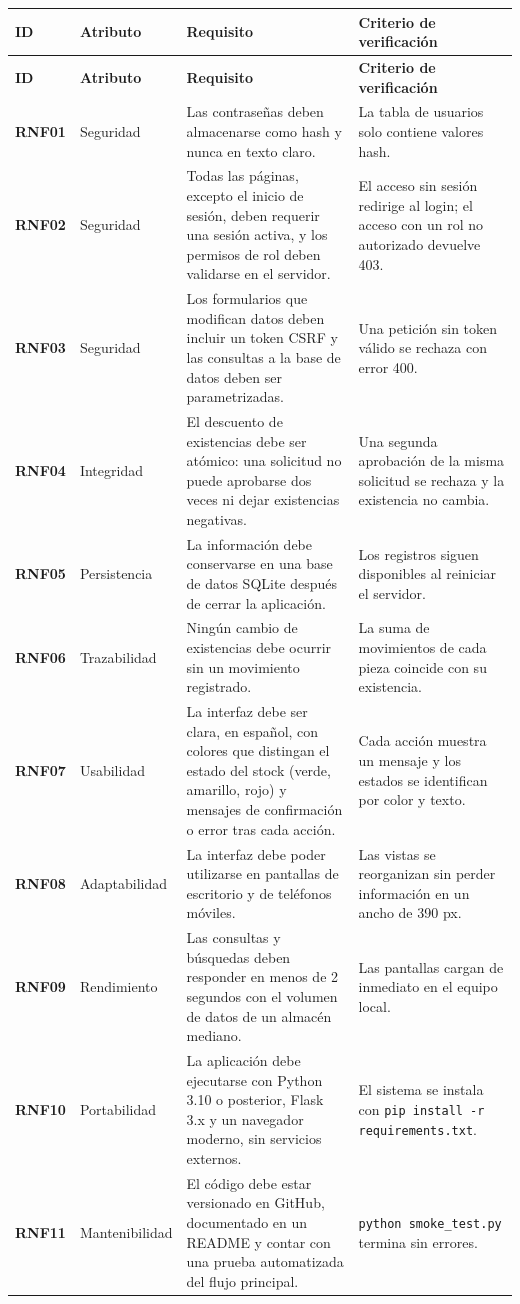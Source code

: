 \documentclass[12pt,letterpaper]{article}
\begin{document}
\begin{longtable}{|>{\bfseries}p{1.5cm}|p{2.4cm}|p{6.2cm}|p{4.7cm}|}
\hline
\rowcolor{azulClaro} \textbf{ID} & \textbf{Atributo} & \textbf{Requisito} & \textbf{Criterio de verificación} \\ \hline
\endfirsthead
\hline
\rowcolor{azulClaro} \textbf{ID} & \textbf{Atributo} & \textbf{Requisito} & \textbf{Criterio de verificación} \\ \hline
\endhead
RNF01 & Seguridad & Las contraseñas deben almacenarse como hash y nunca en texto claro. & La tabla de usuarios solo contiene valores hash. \\ \hline
RNF02 & Seguridad & Todas las páginas, excepto el inicio de sesión, deben requerir una sesión activa, y los permisos de rol deben validarse en el servidor. & El acceso sin sesión redirige al login; el acceso con un rol no autorizado devuelve 403. \\ \hline
RNF03 & Seguridad & Los formularios que modifican datos deben incluir un token CSRF y las consultas a la base de datos deben ser parametrizadas. & Una petición sin token válido se rechaza con error 400. \\ \hline
RNF04 & Integridad & El descuento de existencias debe ser atómico: una solicitud no puede aprobarse dos veces ni dejar existencias negativas. & Una segunda aprobación de la misma solicitud se rechaza y la existencia no cambia. \\ \hline
RNF05 & Persistencia & La información debe conservarse en una base de datos SQLite después de cerrar la aplicación. & Los registros siguen disponibles al reiniciar el servidor. \\ \hline
RNF06 & Trazabilidad & Ningún cambio de existencias debe ocurrir sin un movimiento registrado. & La suma de movimientos de cada pieza coincide con su existencia. \\ \hline
RNF07 & Usabilidad & La interfaz debe ser clara, en español, con colores que distingan el estado del stock (verde, amarillo, rojo) y mensajes de confirmación o error tras cada acción. & Cada acción muestra un mensaje y los estados se identifican por color y texto. \\ \hline
RNF08 & Adaptabilidad & La interfaz debe poder utilizarse en pantallas de escritorio y de teléfonos móviles. & Las vistas se reorganizan sin perder información en un ancho de 390 px. \\ \hline
RNF09 & Rendimiento & Las consultas y búsquedas deben responder en menos de 2 segundos con el volumen de datos de un almacén mediano. & Las pantallas cargan de inmediato en el equipo local. \\ \hline
RNF10 & Portabilidad & La aplicación debe ejecutarse con Python 3.10 o posterior, Flask 3.x y un navegador moderno, sin servicios externos. & El sistema se instala con \texttt{pip install -r requirements.txt}. \\ \hline
RNF11 & Mantenibilidad & El código debe estar versionado en GitHub, documentado en un README y contar con una prueba automatizada del flujo principal. & \texttt{python smoke\_test.py} termina sin errores. \\ \hline
\end{longtable}
\end{document}

